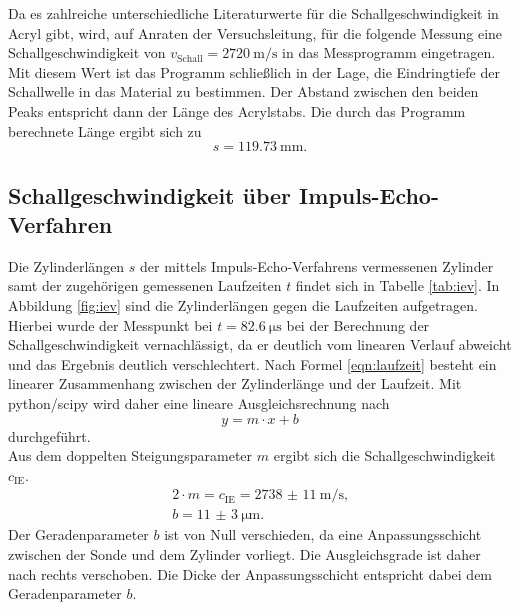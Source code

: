 Da es zahlreiche unterschiedliche Literaturwerte für die Schallgeschwindigkeit in Acryl gibt, wird, auf Anraten der Versuchsleitung, für die folgende Messung eine Schallgeschwindigkeit von $v_{\mathrm{Schall}}=\SI{2720}{\meter\per\second}$ in das Messprogramm eingetragen.
Mit diesem Wert ist das Programm schließlich in der Lage, die Eindringtiefe der Schallwelle in das Material zu bestimmen.
Der Abstand zwischen den beiden Peaks entspricht dann der Länge des Acrylstabs.
Die durch das Programm berechnete Länge ergibt sich zu
\begin{equation}
  s=\SI{119.73}{\milli\meter} \text{.}
\end{equation}
\FloatBarrier

\subsection{Schallgeschwindigkeit über Impuls-Echo-Verfahren}
Die Zylinderlängen $s$ der mittels Impuls-Echo-Verfahrens vermessenen Zylinder samt der zugehörigen gemessenen Laufzeiten $t$ findet sich in Tabelle \ref{tab:iev}. In Abbildung \ref{fig:iev} sind die Zylinderlängen gegen die Laufzeiten aufgetragen.
Hierbei wurde der Messpunkt bei $t=\SI{82.6}{\micro\second}$ bei der Berechnung der Schallgeschwindigkeit vernachlässigt, da er deutlich vom linearen Verlauf abweicht und das Ergebnis deutlich verschlechtert.
Nach Formel \eqref{eqn:laufzeit} besteht ein linearer Zusammenhang zwischen der Zylinderlänge und der Laufzeit.
Mit python/scipy \cite{scipy} wird daher eine lineare Ausgleichsrechnung nach
\begin{equation}
  y=m\cdot x +b
\end{equation}
durchgeführt.\\
Aus dem doppelten Steigungsparameter $m$ ergibt sich die Schallgeschwindigkeit $c_\mathrm{IE}$.
\begin{gather*}
2 \cdot m=c_\mathrm{IE}=  \SI{2738(11)}{\meter\per\second} \text{,}\\
b=  \SI{11(3)}{\micro\meter} \text{.}
\end{gather*}
Der Geradenparameter $b$ ist von Null verschieden, da eine Anpassungsschicht zwischen der Sonde und dem Zylinder vorliegt. Die Ausgleichsgrade ist daher nach rechts verschoben. Die Dicke der Anpassungsschicht entspricht dabei dem Geradenparameter $b$.
